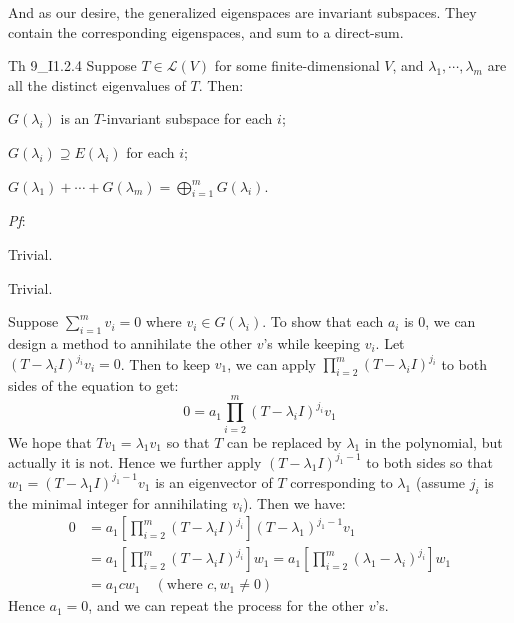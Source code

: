 \documentclass{article}
\begin{document}
And as our desire, the generalized eigenspaces are invariant subspaces. They contain the corresponding eigenspaces, and sum to a direct-sum.

\begin{Th}{Th 9\_I1.2.4}
    Suppose $T\in\mathcal{L}(V)$ for some finite-dimensional $V$, and $\lambda_1, \cdots, \lambda_m$ are all the distinct eigenvalues of $T$. Then:
    \begin{compactenum}
        \item $G(\lambda_i)$ is an $T$-invariant subspace for each $i$;
        \item $G(\lambda_i)\supseteq E(\lambda_i)$ for each $i$;
        \item $G(\lambda_1) + \cdots + G(\lambda_m) = \bigoplus_{i=1}^m G(\lambda_i)$.
    \end{compactenum}
    \tcblower
    \textit{Pf}: 
    \begin{compactenum}
        \item Trivial.
        \item Trivial.
        \item Suppose $\sum_{i=1}^{m} v_i = 0$ where $v_i\in G(\lambda_i)$. To show that each $a_i$ is $0$, we can design a method to annihilate the other $v$'s while keeping $v_i$. Let $(T-\lambda_i I)^{j_i}v_i = 0$. Then to keep $v_1$, we can apply $\prod_{i=2}^{m} (T-\lambda_i I)^{j_i}$ to both sides of the equation to get:
        $$ 0 = a_1\prod_{i=2}^{m} (T-\lambda_i I)^{j_i} v_1$$
        We hope that $Tv_1 = \lambda_1v_1$ so that $T$ can be replaced by $\lambda_1$ in the polynomial, but actually it is not. Hence we further apply $(T-\lambda_1 I)^{j_1-1}$ to both sides so that $w_1 = (T-\lambda_1 I)^{j_1-1}v_1$ is an eigenvector of $T$ corresponding to $\lambda_1$ (assume $j_i$ is the minimal integer for annihilating $v_i$). Then we have:
        $$ 
        \begin{aligned}
            0 &= a_1\left[\prod_{i=2}^{m} (T-\lambda_i I)^{j_i}\right] (T-\lambda_1)^{j_1-1}v_1 \\
            &= a_1\left[\prod_{i=2}^{m} (T-\lambda_i I)^{j_i}\right] w_1 = a_1\left[\prod_{i=2}^{m} (\lambda_1-\lambda_i)^{j_i}\right]w_1 \\
            &= a_1c w_1 \quad (\text{where } c, w_1\neq 0)
        \end{aligned}
        $$
        Hence $a_1 = 0$, and we can repeat the process for the other $v$'s.
    \end{compactenum}
\end{Th}
\end{document}
